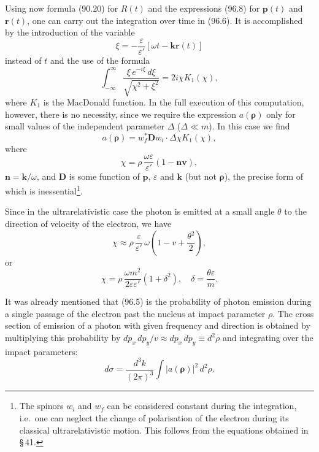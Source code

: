 Using now formula (90.20) for $R(t)$ and the expressions (96.8) for $\mathbf{p}(t)$ and $\mathbf{r}(t)$, one can carry out the integration over time in (96.6). It is accomplished by the introduction of the variable
\[
\xi = -\frac{\varepsilon}{\varepsilon'}[\omega t - \mathbf{k}\mathbf{r}(t)]
\]
instead of $t$ and the use of the formula
\[
\int_{-\infty}^{\infty}\frac{\xi\,e^{-i\xi}\,d\xi}{\sqrt{\chi^2 + \xi^2}} = 2i\chi K_1(\chi),
\]
where $K_1$ is the MacDonald function. In the full execution of this computation, however, there is no necessity, since we require the expression $a(\boldsymbol{\rho})$ only for small values of the independent parameter $\Delta$ ($\Delta \ll m$). In this case we find
\begin{equation}
a(\boldsymbol{\rho}) = w_f^*\mathbf{D}w_i\cdot\Delta\chi K_1(\chi),
\label{eq:96.9}
\end{equation}
where
\[
\chi = \rho\,\frac{\omega\varepsilon}{\varepsilon'}(1 - \mathbf{n}\mathbf{v}),
\]
$\mathbf{n} = \mathbf{k}/\omega$, and $\mathbf{D}$ is some function of $\mathbf{p}$, $\varepsilon$ and $\mathbf{k}$ (but not $\boldsymbol{\rho}$), the precise form of which is inessential\footnote{The spinors $w_i$ and $w_f$ can be considered constant during the integration, i.e.\ one can neglect the change of polarisation of the electron during its classical ultrarelativistic motion. This follows from the equations obtained in \S\,41.}.


Since in the ultrarelativistic case the photon is emitted at a small angle $\theta$ to the direction of velocity of the electron, we have
\[
\chi \approx \rho\,\frac{\varepsilon}{\varepsilon'}\,\omega\!\left(1 - v + \frac{\theta^2}{2}\right),
\]
or
\begin{equation}
\chi = \rho\,\frac{\omega m^2}{2\varepsilon\varepsilon'}(1 + \delta^2), \quad \delta = \frac{\theta\varepsilon}{m}.
\label{eq:96.10}
\end{equation}

It was already mentioned that (96.5) is the probability of photon emission during a single passage of the electron past the nucleus at impact parameter $\rho$. The cross section of emission of a photon with given frequency and direction is obtained by multiplying this probability by $dp_x\,dp_y/v \approx dp_x\,dp_y \equiv d^2\rho$ and integrating over the impact parameters:
\begin{equation}
d\sigma = \frac{d^3k}{(2\pi)^3}\int|a(\boldsymbol{\rho})|^2\,d^2\rho.
\label{eq:96.11}
\end{equation}

